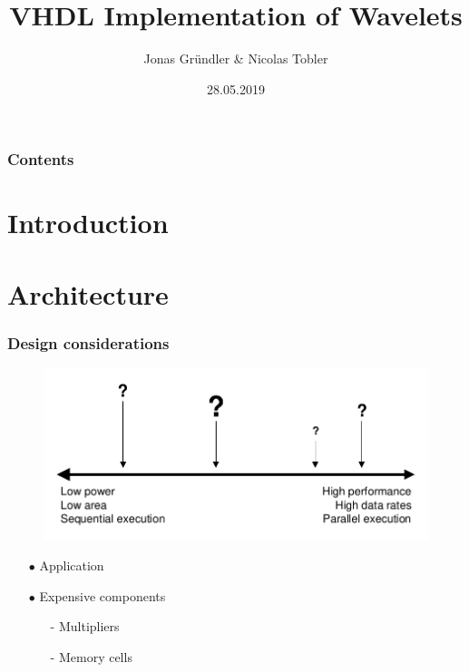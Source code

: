 \documentclass[english, aspectratio=169]{beamer}
\title{VHDL Implementation of Wavelets}
\author{Jonas Gründler \& Nicolas Tobler }
\institute{Mathematisches Seminar 2019}
\date{28.05.2019}
\begin{document}
\begin{frame}
\titlepage
\end{frame}

\begin{frame}
\frametitle{Contents}
\tableofcontents
\end{frame}

\section{Introduction}
\begin{frame}

\end{frame}


\section{Architecture}
\begin{frame}
\frametitle{Design considerations}

\begin{figure}
	\includegraphics[scale=0.7]{design_considerations.pdf}
\end{figure}

\begin{itemize}
	
	\item[$\bullet$] Application

	\item[$\bullet$] Expensive components
	\begin{itemize}
		\item[-] Multipliers
		\item[-] Memory cells
	\end{itemize}
	
\end{itemize}
\end{frame}
\end{document}
